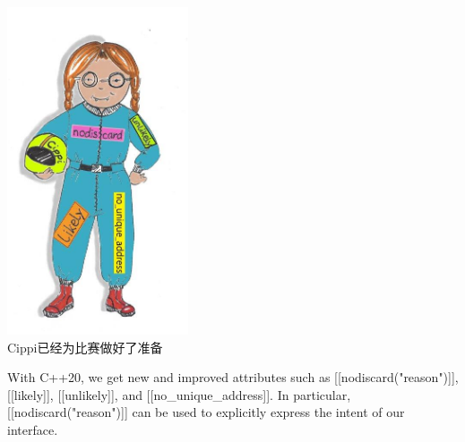 \begin{center}
\includegraphics[width=0.4\textwidth]{content/3/chapter4/images/44.png}\\
Cippi已经为比赛做好了准备
\end{center}

With C++20, we get new and improved attributes such as [[nodiscard("reason")]], [[likely]], [[unlikely]], and [[no\_unique\_address]]. In particular, [[nodiscard("reason")]] can be used to explicitly express the intent of our interface.


